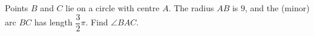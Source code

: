 Points $B$ and $C$ lie on a circle with centre $A$. The radius $AB$ is $9$, and the (minor) arc $BC$ has length $\dfrac32\pi$. Find $\angle BAC$.
